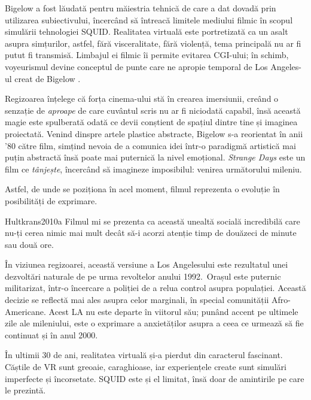 \documentclass[12pt]{article}
\begin{document}
Bigelow a fost lăudată pentru măiestria tehnică de care a dat dovadă prin utilizarea subiectivului, încercând să întreacă limitele mediului filmic în scopul simulării tehnologiei \dedouble SQUID\sqtworight. Realitatea virtuală este portretizată ca un asalt asupra simțurilor, astfel, fără visceralitate, fără violență, tema principală nu ar fi putut fi transmisă. Limbajul ei filmic îi permite evitarea CGI-ului; în schimb, voyeurismul devine conceptul de punte care ne apropie temporal de Los Angeles-ul creat de Bigelow \cite{Hultkrans2010a}.\par

Regizoarea înțelege că forța cinema-ului stă în crearea imersiunii, creând o senzație de \textit{aproape} de care cuvântul scris nu ar fi niciodată capabil, însă această magie este spulberată odată ce devii conștient de spațiul dintre tine și imaginea proiectată. Venind dinspre artele plastice abstracte, Bigelow s-a reorientat în anii '80 către film, simțind nevoia de a comunica idei într-o paradigmă artistică mai puțin abstractă însă poate mai puternică la nivel emoțional. \textit{Strange Days} este un film ce \textit{tânjește}, încercând să imagineze imposibilul: venirea următorului mileniu.

Astfel, de unde se poziționa în acel moment, filmul reprezenta o evoluție în posibilități de exprimare.\par

\begin{displaycquote}{Hultkrans2010a}
	Filmul mi se prezenta ca această unealtă socială incredibilă care nu-ți cerea nimic mai mult decât să-i acorzi atenție timp de douăzeci de minute sau două ore.
\end{displaycquote}

În viziunea regizoarei, această versiune a Los Angelesului este rezultatul unei dezvoltări naturale de pe urma revoltelor anului 1992. Orașul este puternic militarizat, într-o încercare a poliției de a relua control asupra populației. Această decizie se reflectă mai ales asupra celor marginali, în special comunității Afro-Americane. Acest LA nu este departe în viitorul său; punând accent pe ultimele zile ale mileniului, este o exprimare a anxietăților asupra a ceea ce urmează să fie continuat și în anul 2000.\par

În ultimii 30 de ani, realitatea virtuală și-a pierdut din caracterul fascinant. Căștile de VR sunt greoaie, caraghioase, iar experiențele create sunt simulări imperfecte și încorsetate. SQUID este și el limitat, însă doar de amintirile pe care le prezintă.\par
\end{document}
